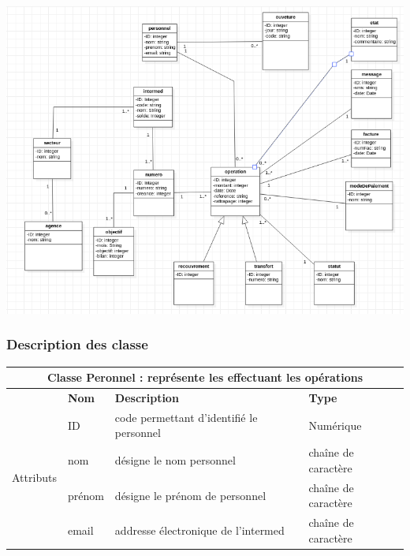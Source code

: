 		\begin{center}
			\includegraphics[width=16cm]{images/diagramme.png}
		\end{center}
	
	\subsubsection{Description des classe}
	
		\begin{center}
			{\renewcommand{\arraystretch}{1.5}\begin{tabularx}{\textwidth}{|l|l|l|X|}
				\hline
				\multicolumn{4}{|c|}{\textbf{Classe Peronnel : représente les effectuant les opérations}}\\
				\hline
				
				& \textbf{Nom} & \textbf{Description} & \textbf{Type} \\
				\multirow{4}{*}{Attributs} & ID & code permettant d'identifié le personnel & Numérique \\
				& nom & désigne le nom personnel & chaîne de caractère \\
				& prénom & désigne le prénom de personnel & chaîne de caractère \\
				& email & addresse électronique de l'intermed & chaîne de caractère\\
				\hline
			\end{tabularx}}
			\label{classe personnel}
		\end{center}
	
